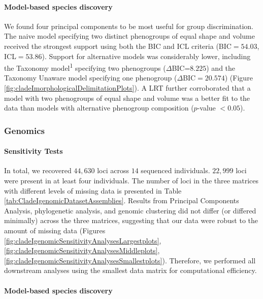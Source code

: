 \documentclass[
  11pt,
]{article}
\begin{document}
\hypertarget{model-based-species-discovery}{%
\paragraph{Model-based species discovery}\label{model-based-species-discovery}}

We found four principal components to be most useful for group discrimination. The naive model specifying two distinct phenogroups of equal shape and volume received the strongest support using both the BIC and ICL criteria (BIC\(=54.03\), ICL\(=53.86\)). Support for alternative models was considerably lower, including the Taxonomy model\textsuperscript{1} specifying two phenogroups (\(\Delta\)BIC=\(8.225\)) and the Taxonomy Unaware model specifying one phenogroup (\(\Delta\)BIC\(=20.574\)) (Figure \ref{fig:cladeImorphologicalDelimitationPlots}). A LRT further corroborated that a model with two phenogroups of equal shape and volume was a better fit to the data than models with alternative phenogroup composition (\(p\)-value \(<0.05\)).

\hypertarget{genomics-1}{%
\subsubsection{Genomics}\label{genomics-1}}

\hypertarget{sensitivity-tests}{%
\paragraph{Sensitivity Tests}\label{sensitivity-tests}}

In total, we recovered \(44,630\) loci across \(14\) sequenced individuals. \(22,999\) loci were present in at least four individuals. The number of loci in the three matrices with different levels of missing data is presented in Table \ref{tab:CladeIgenomicDatasetAssemblies}. Results from Principal Components Analysis, phylogenetic analysis, and genomic clustering did not differ (or differed minimally) across the three matrices, suggesting that our data were robust to the amount of missing data (Figures \ref{fig:cladeIgenomicSensitivityAnalysesLargestplots}, \ref{fig:cladeIgenomicSensitivityAnalysesMiddleplots}, \ref{fig:cladeIgenomicSensitivityAnalysesSmallestplots}). Therefore, we performed all downstream analyses using the smallest data matrix for computational efficiency.

\hypertarget{model-based-species-discovery-1}{%
\paragraph{Model-based species discovery}\label{model-based-species-discovery-1}}
\end{document}
